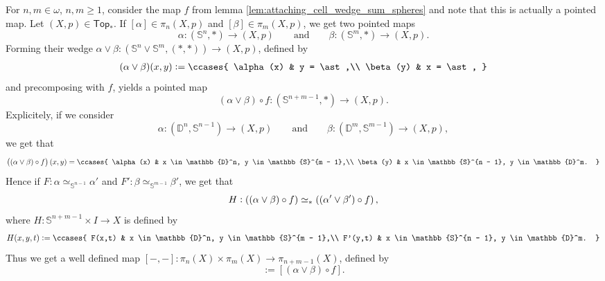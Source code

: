 For $n,m \in \omega$, $n,m \geq 1$, consider the map $f$ from lemma \ref{lem:attaching_cell_wedge_sum_spheres} and note that this is actually a pointed map. Let $(X,p) \in \mathsf{Top}_*$. If $[\alpha] \in \pi_n(X,p)$ and $[\beta] \in \pi_m(X,p)$, we get two pointed maps
\begin{equation*}
	\alpha : (\mathbb{S}^n,\ast) \to (X,p) \qquad \text{and} \qquad \beta : (\mathbb{S}^m,\ast) \to (X,p).
\end{equation*}
Forming their wedge $\alpha \vee \beta : (\mathbb{S}^n \vee \mathbb{S}^m,(\ast,\ast)) \to (X,p)$, defined by
\begin{align*}
	(\alpha \vee \beta) (x,y) := \ccases{
		\alpha(x) & y = \ast,\\
		\beta(y) & x = \ast,
	}
\end{align*}
\noindent and precomposing with $f$, yields a pointed map
\begin{equation*}
	(\alpha \vee \beta) \circ f : (\mathbb{S}^{n + m - 1},\ast) \to (X,p).
\end{equation*}
Explicitely, if we consider
\begin{equation*}
	\alpha : (\mathbb{D}^n,\mathbb{S}^{n - 1}) \to (X,p) \qquad \text{and} \qquad \beta : (\mathbb{D}^m,\mathbb{S}^{m - 1}) \to (X,p),
\end{equation*}
\noindent we get that
\begin{align}
	\label{eq:Whitehead_product}
	\del[1]{(\alpha \vee \beta) \circ f}(x,y) = \ccases{
		\alpha(x) & x \in \mathbb{D}^n, y \in \mathbb{S}^{m - 1},\\
		\beta(y) & x \in \mathbb{S}^{n - 1}, y \in \mathbb{D}^m.
	}
\end{align}
Hence if $F : \alpha \simeq_{\mathbb{S}^{n - 1}} \alpha'$ and $F' : \beta \simeq_{\mathbb{S}^{m - 1}} \beta'$, we get that 
\begin{equation*}
	H : \del[0]{(\alpha \vee \beta) \circ f} \simeq_\ast \del[0]{(\alpha' \vee \beta') \circ f},
\end{equation*}
\noindent where $H : \mathbb{S}^{n + m - 1} \times I \to X$ is defined by
\begin{align*}
	H(x,y,t) := \ccases{
		F(x,t) & x \in \mathbb{D}^n, y \in \mathbb{S}^{m - 1},\\
		F'(y,t) & x \in \mathbb{S}^{n - 1}, y \in \mathbb{D}^m.
	}
\end{align*}
Thus we get a well defined map $[-,-] : \pi_n(X) \times \pi_m(X) \to \pi_{n + m - 1}(X)$, defined by
\begin{equation*}
	[\alpha,\beta] := [(\alpha \vee \beta) \circ f].
\end{equation*}

